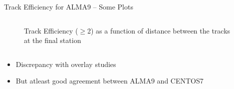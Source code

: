 \begin{frame}{Track Efficiency for ALMA9  -- Some Plots}
\begin{columns}
\begin{column}{0.5 \textwidth}
\begin{figure}
                \caption{Track Efficiency ($\geq$2) as a function of distance between the tracks at the final station}
            \end{figure}
        \end{column}
    \end{columns}
    \begin{itemize}
        \item Discrepancy  with overlay studies
        \item But atleast good agreement between ALMA9 and CENTOS7
    \end{itemize}
\end{frame}